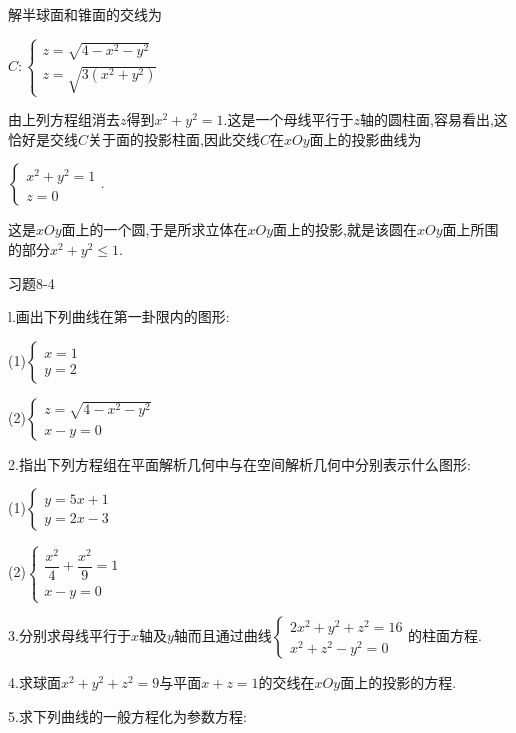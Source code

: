 \documentclass[oneside]{book}
\begin{document}
解半球面和锥面的交线为

$C:\left\{\begin{array}{l}{z=\sqrt{4-x^{2}-y^{2}}} \\ {z=\sqrt{3\left(x^{2}+y^{2}\right)}}\end{array}\right.$

由上列方程组消去$z$得到${x^2} + {y^2} = 1$.这是一个母线平行于$z$轴的圆柱面,容易看出,这恰好是交线$C$关于面的投影柱面,因此交线$C$在$xOy$面上的投影曲线为

$\left\{\begin{array}{l}{x^{2}+y^{2}=1} \\ {z=0}\end{array}\right.$.

这是$xOy$面上的一个圆,于是所求立体在$xOy$面上的投影,就是该圆在$xOy$面上所围的部分${x^2} + {y^2} \leqslant 1$.

习题8-4

l.画出下列曲线在第一卦限内的图形:

(1)$\left\{\begin{array}{l}{x=1} \\ {y=2}\end{array}\right.$

(2)$\left\{\begin{array}{l}{z=\sqrt{4-x^{2}-y^{2}}} \\ {x-y=0}\end{array}\right.$

2.指出下列方程组在平面解析几何中与在空间解析几何中分别表示什么图形:

(1)$\left\{\begin{array}{l}{y=5 x+1} \\ {y=2 x-3}\end{array}\right.$

(2)$\left\{\begin{array}{l}{\dfrac{x^{2}}{4}+\dfrac{x^{2}}{9}=1} \\ {x-y=0}\end{array}\right.$

3.分别求母线平行于$x$轴及$y$轴而且通过曲线$\left\{\begin{array}{l}{2 x^{2}+y^{2}+z^{2}=16} \\ {x^{2}+z^{2}-y^{2}=0}\end{array}\right.$的柱面方程.

4.求球面${x^2} + {y^2} + {z^2} = 9$与平面$x + z = 1$的交线在$xOy$面上的投影的方程.

5.求下列曲线的一般方程化为参数方程:
\end{document}
